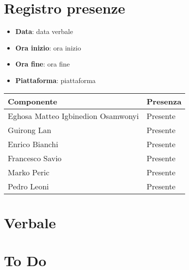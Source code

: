 \documentclass[a4paper, 12pt]{article}
\begin{document}
\section{Registro presenze}
\begin{itemize}
    \item[] \textbf{Data}: data verbale
    \item[] \textbf{Ora inizio}:  ora inizio
    \item[] \textbf{Ora fine}: ora fine
    \item[] \textbf{Piattaforma}: piattaforma	
\end{itemize}
\begin{table}[!h]
\centering
{\renewcommand{\arraystretch}{2}
\begin{tabularx}{\textwidth}{| X | X |}
    \hline
        \textbf{\large Componente} & 
        \textbf{\large Presenza} \\ 
    \hline 
    \hline
        Eghosa Matteo Igbinedion Osamwonyi&
        Presente \\
    \hline 
        Guirong Lan&
        Presente \\
    \hline 
        Enrico Bianchi&
        Presente \\
    \hline 
        Francesco Savio&
        Presente \\
    \hline 
        Marko Peric&
        Presente \\
    \hline 
        Pedro Leoni&
        Presente \\
    \hline 

\end{tabularx}}
\end{table}

\newpage

\section{Verbale}

\section{To Do}
\end{document}

